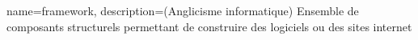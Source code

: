 
\begin{comment}
Glossaire : 
  Nouvelle entrée :
    \newglossaryentry{test} %
    {%
        name={test}, %
        description={<description>}, %
        plural={tests} %
    }
  Usage : 
    \gls{test} Retourne "test"
    \Gls{test} Retourne "Test"
    \glsplural{test} Retourne "tests"
    \Glsplural{test} Retourne "Tests"
        
Pour des mots utilisés fréquemment, petite astuce : 
	\newcommand{\bsr}{bilan scientifique régional} 
Ensuite, dans le contenu, il suffit d'y faire référence comme ceci : "\bsr{}"
\end{comment}


    {%
        name={framework},
        description={(Anglicisme informatique) Ensemble de composants structurels permettant de construire des logiciels ou des sites internet}
    }


\newcommand{\bv}{Bureau Veritas}
\newcommand{\na}{Nouvelle-Aquitaine}
\newcommand{\onepoint}{onepoint}
